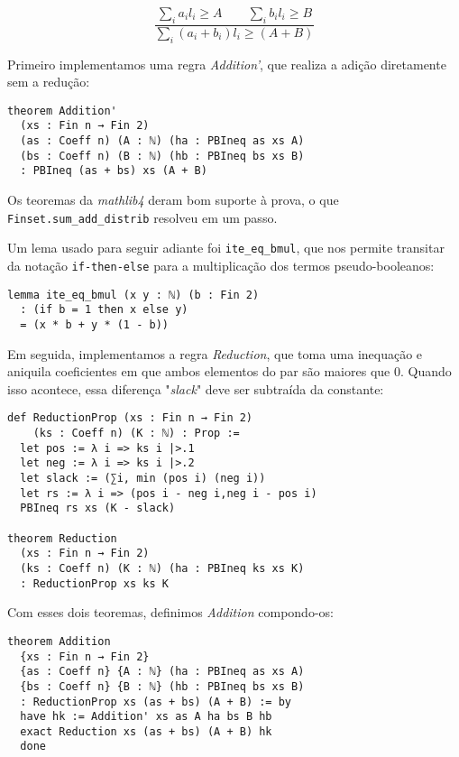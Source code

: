\documentclass[conference]{IEEEtran}
\begin{document}
\begin{equation}
    \frac
    {{\sum_i{a_i l_i} \ge A}\qquad {\sum_i{b_i l_i} \ge B}}
    {\sum_i{(a_i + b_i) l_i} \ge (A+B)}
\end{equation}

Primeiro implementamos uma regra \textit{Addition'}, que realiza a adição diretamente sem a redução:

\begin{verbatim}
theorem Addition'
  (xs : Fin n → Fin 2)
  (as : Coeff n) (A : ℕ) (ha : PBIneq as xs A)
  (bs : Coeff n) (B : ℕ) (hb : PBIneq bs xs B)
  : PBIneq (as + bs) xs (A + B)
\end{verbatim}

Os teoremas da \textit{mathlib4} deram bom suporte à prova, o que \texttt{Finset.sum\_add\_distrib} resolveu em um passo.

Um lema usado para seguir adiante foi \texttt{ite\_eq\_bmul},
que nos permite transitar da notação \texttt{if-then-else}
para a multiplicação dos termos pseudo-booleanos:

\begin{verbatim}
lemma ite_eq_bmul (x y : ℕ) (b : Fin 2)
  : (if b = 1 then x else y)
  = (x * b + y * (1 - b))
\end{verbatim}

Em seguida, implementamos a regra \textit{Reduction}, que toma uma inequação e aniquila coeficientes
em que ambos elementos do par são maiores que $0$.
Quando isso acontece, essa diferença "\textit{slack}" deve ser subtraída da constante:

\begin{verbatim}
def ReductionProp (xs : Fin n → Fin 2)
    (ks : Coeff n) (K : ℕ) : Prop :=
  let pos := λ i => ks i |>.1
  let neg := λ i => ks i |>.2
  let slack := (∑i, min (pos i) (neg i))
  let rs := λ i => (pos i - neg i,neg i - pos i)
  PBIneq rs xs (K - slack)

theorem Reduction
  (xs : Fin n → Fin 2)
  (ks : Coeff n) (K : ℕ) (ha : PBIneq ks xs K)
  : ReductionProp xs ks K
\end{verbatim}

Com esses dois teoremas, definimos \textit{Addition} compondo-os:

\begin{verbatim}
theorem Addition
  {xs : Fin n → Fin 2}
  {as : Coeff n} {A : ℕ} (ha : PBIneq as xs A)
  {bs : Coeff n} {B : ℕ} (hb : PBIneq bs xs B)
  : ReductionProp xs (as + bs) (A + B) := by
  have hk := Addition' xs as A ha bs B hb
  exact Reduction xs (as + bs) (A + B) hk
  done
\end{verbatim}
\end{document}
